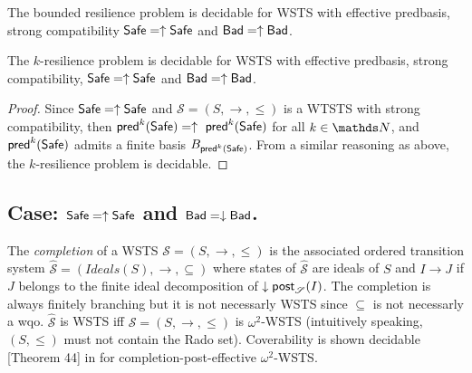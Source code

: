 \begin{corollary}\label{B-up-up}
The bounded resilience problem is decidable for WSTS with effective predbasis,
strong compatibility
 $\textsf{Safe}=\uparrow \textsf{Safe}$
and $\textsf{Bad}=\uparrow \textsf{Bad}$.
\end{corollary}


\begin{theorem}\label{k-up-up}
The %
$k$-resilience problem is decidable for WSTS with effective predbasis, strong %
compatibility, $\textsf{Safe}=\uparrow \textsf{Safe}$
and $\textsf{Bad}=\uparrow \textsf{Bad}$.
\end{theorem}

\begin{proof}
Since $\textsf{Safe}=\uparrow \textsf{Safe}$ and
$\mathscr{S}=(S,\rightarrow,\leq)$ is a WTSTS with strong %
compatibility, then $\textsf{pred}^k(\textsf{Safe})= \uparrow~\textsf{pred}^k(\textsf{Safe})$ for all $k \in \N$, and $\textsf{pred}^k(\textsf{Safe})$ admits a finite basis $B_{\textsf{pred}^k(\textsf{Safe})}$. From a similar reasoning as above, the $k$-resilience problem is decidable.
\end{proof}




\subsection{Case: $\textsf{Safe}=\uparrow \textsf{Safe}$ and $\textsf{Bad}=\downarrow \textsf{Bad}$.}

%
%




The \emph{completion}  \cite{BFM-ic17} of a WSTS $\mathscr{S}=(S,\rightarrow, \leq)$ is the associated ordered transition system $\hat{\mathscr{S}}=(Ideals(S),\rightarrow, \subseteq)$ where states of $\hat{\mathscr{S}}$ are ideals of $S$ and $I \rightarrow J$ if $J$ belongs to the finite ideal decomposition of $\downarrow \textsf{post}_{\mathscr{S}}(I)$. The completion is always finitely branching but it is not necessarly WSTS since $\subseteq$ is not necessarly a wqo. $\hat{\mathscr{S}}$ is WSTS iff $\mathscr{S}=(S,\rightarrow, \leq)$ is $\omega^2$-WSTS (intuitively speaking, $(S,\leq)$ must not contain the Rado set). Coverability is shown decidable  [Theorem 44] in \cite{BFM-ic17} for completion-post-effective $\omega^2$-WSTS.

